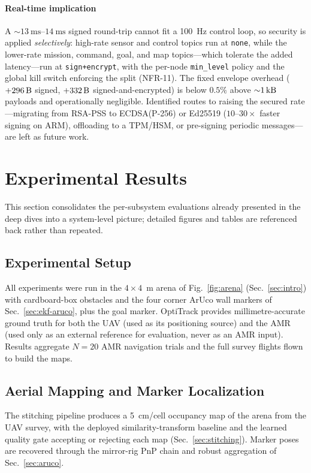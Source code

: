 \documentclass[conference]{IEEEtran}
\begin{document}
\paragraph{Real-time implication}
A ${\sim}\SIrange{13}{14}{\milli\second}$ signed round-trip cannot fit a
\SI{100}{\hertz} control loop, so security is applied \emph{selectively}: high-rate
sensor and control topics run at \texttt{none}, while the lower-rate mission,
command, goal, and map topics---which tolerate the added latency---run at
\texttt{sign+encrypt}, with the per-node \texttt{min\_level} policy and the global
kill switch enforcing the split (NFR-11). The fixed envelope overhead
($+\SI{296}{\byte}$ signed, $+\SI{332}{\byte}$ signed-and-encrypted) is below
$0.5\%$ above ${\sim}\SI{1}{\kilo\byte}$ payloads and operationally negligible.
Identified routes to raising the secured rate---migrating from RSA-PSS to
ECDSA(P-256) or Ed25519 ($10$--$30\times$ faster signing on ARM), offloading to a
TPM/HSM, or pre-signing periodic messages---are left as future work.

\section{Experimental Results}
\label{sec:results}

This section consolidates the per-subsystem evaluations already presented in the
deep dives into a system-level picture; detailed figures and tables are referenced
back rather than repeated.

\subsection{Experimental Setup}
All experiments were run in the $4\times4$~m arena of Fig.~\ref{fig:arena}
(Sec.~\ref{sec:intro}) with cardboard-box obstacles and the four corner ArUco
wall markers of Sec.~\ref{sec:ekf-aruco}, plus the goal marker. OptiTrack provides
millimetre-accurate ground truth for both the UAV (used as its positioning source)
and the AMR (used only as an external reference for evaluation, never as an AMR
input). %
Results aggregate $N=20$ AMR navigation trials and the full survey flights flown
to build the maps.

\subsection{Aerial Mapping and Marker Localization}
The stitching pipeline produces a \SI{5}{\centi\meter}/cell occupancy map of the
arena from the UAV survey, with the deployed similarity-transform baseline and the
learned quality gate accepting or rejecting each map
(Sec.~\ref{sec:stitching}). Marker poses are recovered through the mirror-rig PnP
chain and robust aggregation of Sec.~\ref{sec:aruco}.
\end{document}
